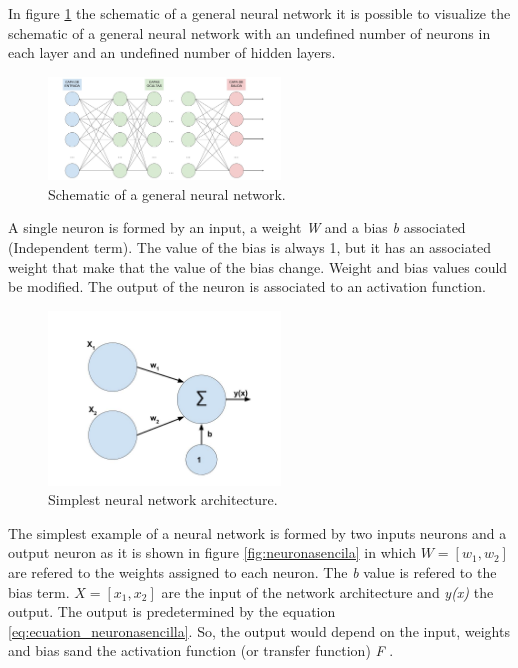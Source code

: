 In figure \ref{fig:esquemaneuronal} the schematic of a general neural network it is possible to visualize the schematic of a general neural network with an undefined number of neurons in each layer and an undefined number of hidden layers.\\

\begin{figure}[htb]
\centering
\includegraphics[width=0.55\textwidth]{images_miscelaneus/red_neuronal.jpg}
\caption{Schematic of a general neural network.} \label{fig:esquemaneuronal}
\end{figure}

A single neuron is formed by an input, a weight \textit{W} and a bias \textit{b} associated (Independent term). The value of the bias is always 1, but it has an associated weight that make that the value of the bias change. Weight and bias values could be modified. The output of the neuron is associated to an activation function. \\

\begin{figure}[htb]
\centering
\includegraphics[width=0.55\textwidth]{images_miscelaneus/neurona_sencilla.jpg}
\caption{Simplest neural network architecture.} \label{fig:neuronasencilla}
\end{figure}

The simplest example of a neural network is formed by two inputs neurons and a output neuron as it is shown in figure \ref{fig:neuronasencila} in which \textit{$W=[w_1,w_2]$} are refered to the weights assigned to each neuron. The \textit{b} value is refered to the bias term. \textit{$X=[x_{1},x_{2}]$} are the input of the network architecture and \textit{y(x)} the output. The output is predetermined by the equation \ref{eq:ecuation_neuronasencilla}. So, the output would depend on the input, weights and bias sand the activation function (or transfer function) \textit{F} \cite{krose}. \\

